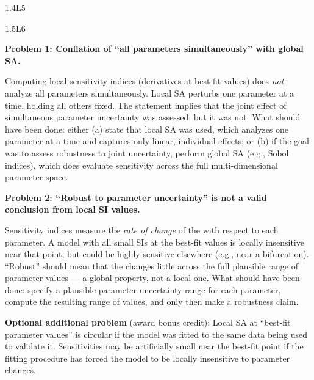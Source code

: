 \begin{solution}{1.4}{L5}

\end{solution}

\begin{solution}{1.5}{L6}

\solanswer

\textbf{Problem 1: Conflation of ``all parameters simultaneously''
with global SA.}

Computing local sensitivity indices (derivatives at best-fit values)
does \emph{not} analyze all parameters simultaneously. Local SA
perturbs one parameter at a time, holding all others fixed.
The statement implies that the joint effect of simultaneous parameter
uncertainty was assessed, but it was not.
What should have been done: either (a) state that local SA was used,
which analyzes one parameter at a time and captures only linear,
individual effects; or (b) if the goal was to assess robustness to
joint uncertainty, perform global SA (e.g., Sobol indices), which
does evaluate sensitivity across the full multi-dimensional parameter
space.

\textbf{Problem 2: ``Robust to parameter uncertainty'' is not a
valid conclusion from local SI values.}

Sensitivity indices measure the \emph{rate of change} of the \QOI
with respect to each parameter. A model with all small SIs at the
best-fit values is locally insensitive near that point, but could
be highly sensitive elsewhere (e.g., near a bifurcation).
``Robust'' should mean that the \QOI changes little across the full
plausible range of parameter values --- a global property, not a
local one. What should have been done: specify a plausible parameter
uncertainty range for each parameter, compute the resulting range
of \QOI values, and only then make a robustness claim.

\textbf{Optional additional problem} (award bonus credit): Local SA
at ``best-fit parameter values'' is circular if the model was fitted
to the same data being used to validate it. Sensitivities may be
artificially small near the best-fit point if the fitting procedure
has forced the model to be locally insensitive to parameter changes.


\end{solution}
